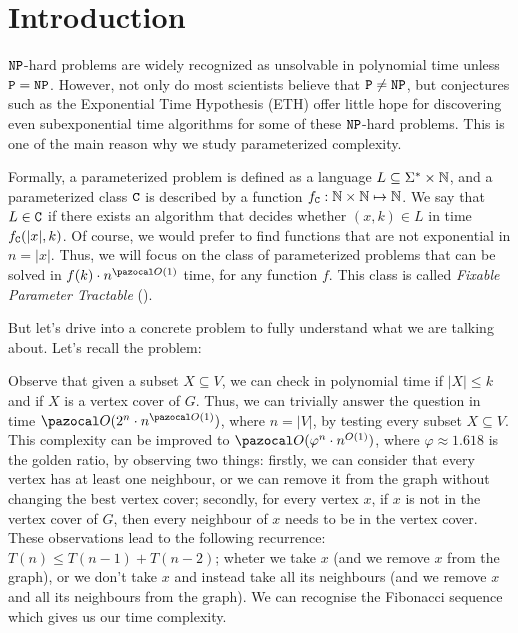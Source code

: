 \section{Introduction}

$\texttt{NP}$-hard problems are widely recognized as unsolvable in polynomial time unless $\texttt{P} = \texttt{NP}$. However, not only do most scientists believe that $\texttt{P} \neq \texttt{NP}$, but conjectures such as the Exponential Time Hypothesis (ETH) \cite{impagliazzo2001complexity} offer little hope for discovering even subexponential time algorithms for some of these $\texttt{NP}$-hard problems. This is one of the main reason why we study parameterized complexity.

Formally, a parameterized problem is defined as a language $L \subseteq \Sigma^* \times \mathbb{N}$, and a parameterized class $\texttt{C}$ is described by a function $f_{\texttt{C}} : \mathbb{N} \times \mathbb{N} \mapsto \mathbb{N}$. We say that $L \in \texttt{C}$ if there exists an algorithm that decides whether $(x, k) \in L$ in time $f_{\texttt{C}}(|x|, k)$. Of course, we would prefer to find functions that are not exponential in $n = |x|$. Thus, we will focus on the class of parameterized problems that can be solved in $f(k)\cdot n^{\O(1)}$ time, for any function $f$. This class is called \textit{Fixable Parameter Tractable} ().

\medskip

But let's drive into a concrete problem to fully understand what we are talking about. Let's recall the  problem:

\begin{problem}
\end{problem}

Observe that given a subset $X \subseteq V$, we can check in polynomial time if $|X| \leq k$ and if $X$ is a vertex cover of $G$. Thus, we can trivially answer the question in time $\O(2^n \cdot n^{\O(1)})$, where $n = |V|$, by testing every subset $X \subseteq V$. This complexity can be improved to $\O(\varphi^n \cdot n^{O(1)})$, where $\varphi \approx 1.618$ is the golden ratio, by observing two things: firstly, we can consider that every vertex has at least one neighbour, or we can remove it from the graph without changing the best vertex cover; secondly, for every vertex $x$, if $x$ is not in the vertex cover of $G$, then every neighbour of $x$ needs to be in the vertex cover. These observations lead to the following recurrence: $T(n) \leq T(n - 1) + T(n - 2)$; wheter we take $x$ (and we remove $x$ from the graph), or we don't take $x$ and instead take all its neighbours (and we remove $x$ and all its neighbours from the graph). We can recognise the Fibonacci sequence which gives us our time complexity.

